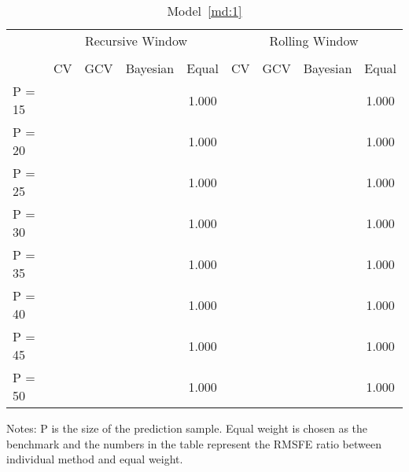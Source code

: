 
\begin{sidewaystable}
\caption{Model~\ref{md:1}}
\centering
\begin{adjustbox}{keepaspectratio}
\begin{threeparttable}
\begin{tabular}{lcccccccc}
\toprule
 & \multicolumn{4}{c}{Recursive Window} & \multicolumn{4}{c}{Rolling Window}\\%
\cmidrule(r){2-5}
\cmidrule(r){6-9}\\
       & CV & GCV & Bayesian & Equal & CV & GCV & Bayesian & Equal \\
P = 15 & & & & 1.000& & & & 1.000\\
P = 20 & & & & 1.000& & & & 1.000\\
P = 25 & & & & 1.000& & & & 1.000\\
P = 30 & & & & 1.000& & & & 1.000\\
P = 35 & & & & 1.000& & & & 1.000\\
P = 40 & & & & 1.000& & & & 1.000\\
P = 45 & & & & 1.000& & & & 1.000\\
P = 50 & & & & 1.000& & & & 1.000\\
\bottomrule
\end{tabular}
\begin{tablenotes} \footnotesize
Notes: $\mathrm{P}$ is the size of the prediction sample. Equal weight is chosen as the benchmark and the numbers in the table represent the RMSFE ratio between individual method and equal weight.
\end{tablenotes}
\end{threeparttable}
\end{adjustbox}
\end{sidewaystable}
